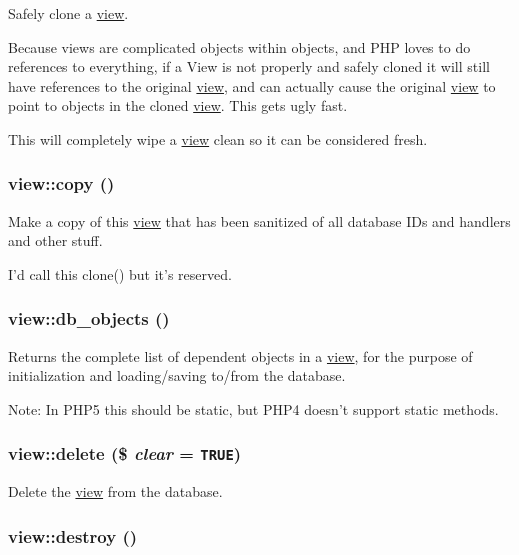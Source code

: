 Safely clone a \hyperlink{classview}{view}.

Because views are complicated objects within objects, and PHP loves to do references to everything, if a View is not properly and safely cloned it will still have references to the original \hyperlink{classview}{view}, and can actually cause the original \hyperlink{classview}{view} to point to objects in the cloned \hyperlink{classview}{view}. This gets ugly fast.

This will completely wipe a \hyperlink{classview}{view} clean so it can be considered fresh. \hypertarget{classview_bc650102ccd583bd362f0e32fe091b99}{
\subsubsection[{copy}]{\setlength{\rightskip}{0pt plus 5cm}view::copy ()}}
\label{classview_bc650102ccd583bd362f0e32fe091b99}


Make a copy of this \hyperlink{classview}{view} that has been sanitized of all database IDs and handlers and other stuff.

I'd call this clone() but it's reserved. \hypertarget{classview_7df52d46e3a8245e6d8f415133c31cad}{
\subsubsection[{db\_\-objects}]{\setlength{\rightskip}{0pt plus 5cm}view::db\_\-objects ()}}
\label{classview_7df52d46e3a8245e6d8f415133c31cad}


Returns the complete list of dependent objects in a \hyperlink{classview}{view}, for the purpose of initialization and loading/saving to/from the database.

Note: In PHP5 this should be static, but PHP4 doesn't support static methods. \hypertarget{classview_ded9b6fb90cc3107254f6a98f910649f}{
\subsubsection[{delete}]{\setlength{\rightskip}{0pt plus 5cm}view::delete (\$ {\em clear} = {\tt TRUE})}}
\label{classview_ded9b6fb90cc3107254f6a98f910649f}


Delete the \hyperlink{classview}{view} from the database. \hypertarget{classview_cbe0d04120a4fe96759d84f5287e154d}{
\subsubsection[{destroy}]{\setlength{\rightskip}{0pt plus 5cm}view::destroy ()}}
\label{classview_cbe0d04120a4fe96759d84f5287e154d}


